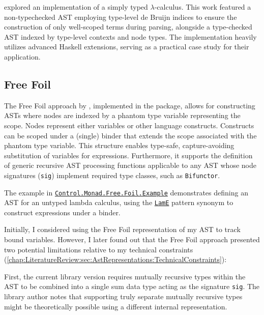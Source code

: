 \citeauthor{eisenberg-stitch-2020} \cite{eisenberg-stitch-2020} explored an implementation of a simply typed $\lambda$-calculus. This work featured a non-typechecked AST employing type-level de Bruijn indices to ensure the construction of only well-scoped terms during parsing, alongside a type-checked AST indexed by type-level contexts and node types. The implementation heavily utilizes advanced Haskell extensions, serving as a practical case study for their application.

\subsection{Free Foil}
\label{chap:LiteratureReview:sec:AstRepresentations:FreeFoil}

The Free Foil approach \cite{kudasov-free-2024} by \citeauthor{kudasov-free-2024}, implemented in the \cite{free-foil-hackage} package, allows for constructing ASTs where nodes are indexed by a phantom type variable representing the scope. Nodes represent either variables or other language constructs. Constructs can be scoped under a (single) binder that extends the scope associated with the phantom type variable. This structure enables type-safe, capture-avoiding substitution of variables for expressions. Furthermore, it supports the definition of generic recursive AST processing functions applicable to any AST whose node signatures (\texttt{sig}) implement required type classes, such as \texttt{Bifunctor}.

The example in \href{https://hackage.haskell.org/package/free-foil-0.2.0/docs/Control-Monad-Free-Foil-Example.html}{\texttt{Control.Monad.Free.Foil.Example}} demonstrates defining an AST for an untyped lambda calculus, using the \href{https://hackage.haskell.org/package/free-foil-0.2.0/docs/src/Control.Monad.Free.Foil.Example.html#LamE}{\texttt{LamE}} pattern synonym to construct expressions under a binder.

Initially, I considered using the Free Foil representation of my AST to track bound variables. However, I later found out that the Free Foil approach presented two potential limitations relative to my technical constraints (\cref{chap:LiteratureReview:sec:AstRepresentations:TechnicalConstraints}):

First, the current library version requires mutually recursive types within the AST to be combined into a single sum data type acting as the signature \texttt{sig}. The library author notes that supporting truly separate mutually recursive types might be theoretically possible using a different internal representation.

